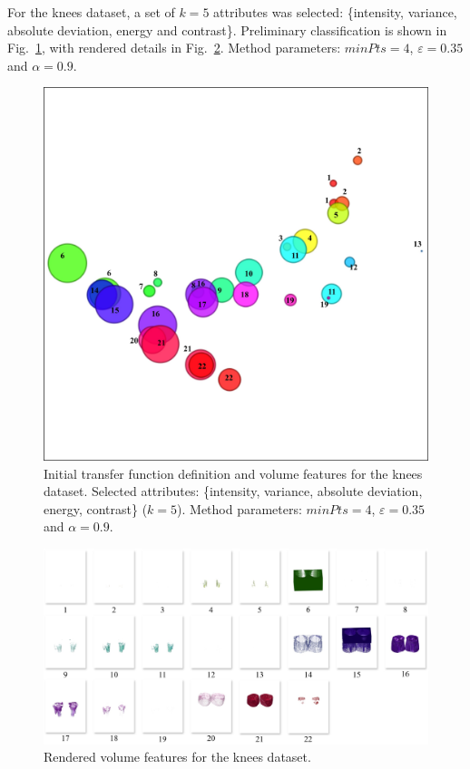 For the knees dataset, a set of \(k = 5\) attributes was selected: \{intensity, variance, absolute deviation, energy and contrast\}. Preliminary classification is shown in Fig.~\ref{fig:knees-tf-clusters}, with rendered details in Fig.~\ref{fig:knees-clusters}. Method parameters: $minPts=4$, $\varepsilon=0.35$ and $\alpha=0.9$.

\begin{figure}[htb!]
    \centering
    \includegraphics[width=0.7\columnwidth]{figs/knees-clusters-tf.jpg} 
    \caption{Initial transfer function definition and volume features for the knees dataset. Selected attributes: \{intensity, variance, absolute deviation, energy, contrast\} (\(k=5\)). Method parameters: $minPts=4$, $\varepsilon=0.35$ and $\alpha=0.9$.}
    \label{fig:knees-tf-clusters}
\end{figure}

\begin{figure}[htb!]
    \centering
    \includegraphics[width=\columnwidth]{figs/knees-clusters.jpg} 
    \caption{Rendered volume features for the knees dataset.}
    \label{fig:knees-clusters}
\end{figure}

